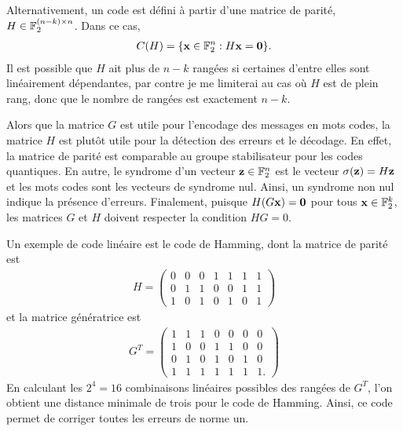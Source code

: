 Alternativement,
un code est défini à partir d'une matrice de parité, $H \in \mathbb{F}_{2}^{(n - k) \times n}$.
Dans ce cas,
\begin{align}
	C(H) = \qty{
		\vb x \in \mathbb{F}_{2}^n : H \vb x = \vb 0
	}.
\end{align}
Il est possible que $H$ ait plus de $n - k$ rangées si certaines d'entre elles 
sont linéairement dépendantes, par contre je me limiterai au cas où $H$ est 
de plein rang, donc que le nombre de rangées est exactement $n - k$.

Alors que la matrice $G$ est utile pour l'encodage des messages en mots codes,
la matrice $H$ est plutôt utile pour la détection des erreurs et le décodage.
En effet,
la matrice de parité est comparable au groupe stabilisateur pour les codes quantiques.
En autre,
le syndrome d'un vecteur $\vb z \in \mathbb{F}_{2}^n$ est le vecteur $\sigma(\vb z) = H\vb z$
et les mots codes sont les vecteurs de syndrome nul.
Ainsi, un syndrome non nul indique la présence d'erreurs.
Finalement, puisque $H (G\vb x) = \vb 0$ pour tous $\vb x \in \mathbb{F}_{2}^k$,
les matrices $G$ et $H$ doivent respecter la condition $HG = 0$.

Un exemple de code linéaire est le code de Hamming, dont la matrice
de parité est 
\begin{align}
	H = \begin{pmatrix}
		0 & 0 & 0 & 1 & 1 & 1 & 1 \\
		0 & 1 & 1 & 0 & 0 & 1 & 1 \\
		1 & 0 & 1 & 0 & 1 & 0 & 1
	\end{pmatrix}
\end{align}
et la matrice génératrice est 
\begin{align}
	G^T = \begin{pmatrix}
		1 & 1 & 1 & 0 & 0 & 0 & 0 \\
		1 & 0 & 0 & 1 & 1 & 0 & 0 \\
		0 & 1 & 0 & 1 & 0 & 1 & 0 \\
		1 & 1 & 1 & 1 & 1 & 1 & 1.
	\end{pmatrix}
\end{align}
En calculant les $2^4 = 16$ combinaisons linéaires possibles des 
rangées de $G^T$,
l'on obtient une distance minimale de trois pour le code de Hamming.
Ainsi,
ce code permet de corriger toutes les erreurs de norme un.

